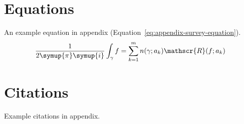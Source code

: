 \begin{survey}
\section{Equations}

An example equation in appendix (Equation~\eqref{eq:appendix-survey-equation}).
\begin{equation}
  \frac{1}{2 \symup{\pi} \symup{i}} \int_\gamma f = \sum_{k=1}^m n(\gamma; a_k) \mathscr{R}(f; a_k)
  \label{eq:appendix-survey-equation}
\end{equation}


\section{Citations}

Example citations in appendix.
\cite{abrahams99tex}
\cite{salomon1995advanced}
\cite{abrahams99tex,salomon1995advanced}





\end{survey}

